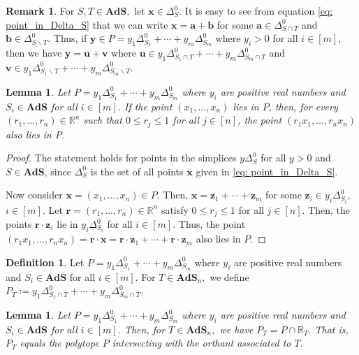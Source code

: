 \documentclass[12pt,reqno]{article}%
\newtheorem{lem}[thm]{Lemma}
\theoremstyle{definition}
\newtheorem{defn}[thm]{Definition}
\newtheorem{rem}[thm]{Remark}
\numberwithin{equation}{section}
\newcommand{\bba}{\mathbf{a}}
\newcommand{\bbb}{\mathbf{b}}
\newcommand{\bbr}{\mathbf{r}}
\newcommand{\bbu}{\mathbf{u}}
\newcommand{\bbv}{\mathbf{v}}
\newcommand{\bbx}{\mathbf{x}}
\newcommand{\bby}{\mathbf{y}}
\newcommand{\bbz}{\mathbf{z}}
\newcommand{\R}{\mathbb R}
\newcommand{\ads}{\mathbf{AdS}}
\newcommand{\sym}{\Delta^0}
\begin{document}
\begin{rem}\label{rem: separation_by_T}
    For $S, T \in \ads,$ let $\bbx \in \sym_S$.  It is easy to see from equation \eqref{eq: point_in_Delta_S} that we can write $\bbx = \bba + \bbb$ for some $\bba \in \sym_{S\cap T}$ and $\bbb \in \sym_{S\backslash T}.$ Thus, if $\bby \in P = y_1\Delta^0_{S_1} + \cdots + y_m\Delta^0_{S_m}$ where $y_i > 0$ for all $i \in [m]$, then we have $\bby = \bbu + \bbv$ where $\bbu \in y_1\Delta^0_{S_1\cap T} + \cdots + y_m\Delta^0_{S_m\cap T}$ and $\bbv \in y_1\Delta^0_{S_1\backslash T} + \cdots + y_m\Delta^0_{S_m \backslash T}$.
\end{rem}

\begin{lem}\label{lem: inP}
    Let $P = y_1\Delta^0_{S_1} + \cdots + y_m\Delta^0_{S_m}$ where $y_i$ are positive real numbers and $S_i \in \ads$ for all $i \in [m]$. If the point $(x_1, \dots, x_n)$ lies in $P$, then, for every $(r_1, \dots, r_n) \in \R^n$ such that $0 \leq r_j \leq 1$ for all $j \in [n]$, the point $(r_1x_1, \dots, r_nx_n)$ also lies in $P$.
\end{lem}

\begin{proof}
    The statement holds for points in the simplices $y\Delta^0_{S}$ for all $y > 0$ and $S \in \ads$, since $\Delta^0_{S}$ is the set of all points $\bbx$ given in \eqref{eq: point_in_Delta_S}.

    Now consider $\bbx = (x_1, \dots, x_n) \in P.$ Then, $\bbx = \bbz_1 + \cdots + \bbz_m$ for some $\bbz_i \in y_i\sym_{S_i},$ $i\in [m]$. Let $\bbr = (r_1, \dots, r_n) \in \R^n$ satisfy $0 \leq r_j \leq 1$ for all $j \in [n]$. Then, the points $\bbr\cdot\bbz_i$ lie in $y_i\sym_{S_i}$ for all $i \in [m]$. Thus, the point $(r_1x_1, \dots, r_n x_n) = \bbr\cdot \bbx = \bbr\cdot\bbz_1 + \cdots + \bbr\cdot \bbz_m$
    also lies in $P.$
\end{proof}

\begin{defn}
    Let $P = y_1\Delta^0_{S_1} + \cdots + y_m\Delta^0_{S_m}$ where $y_i$ are positive real numbers and $S_i \in \ads$ for all $i \in [m]$. For $T \in \ads_n,$ we define $P_T := y_1\Delta^0_{S_1\cap T} + \cdots + y_m\Delta^0_{S_m\cap T}.$
\end{defn}

\begin{lem}\label{lem: P_T}
    Let $P = y_1\Delta^0_{S_1} + \cdots + y_m\Delta^0_{S_m}$ where $y_i$ are positive real numbers and $S_i \in \ads$ for all $i \in [m]$. Then, for $T \in \ads_n,$ we have $P_T = P \cap \R_T.$ That is, $P_T$ equals the polytope $P$ intersecting with the orthant associated to $T.$
\end{lem}
\end{document}
